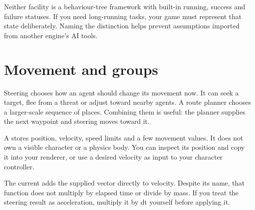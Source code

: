 \documentclass[11pt,a4paper]{article}
\begin{document}
Neither facility is a behaviour-tree framework with built-in running, success and failure statuses. If you need long-running tasks, your game must represent that state deliberately. Naming the distinction helps prevent assumptions imported from another engine's AI tools.
\clearpage\part{Movement and groups}
Steering chooses how an agent should change its movement now. It can seek a target, flee from a threat or adjust toward nearby agents. A route planner chooses a larger-scale sequence of places. Combining them is useful: the planner supplies the next waypoint and steering moves toward it.

A  stores position, velocity, speed limits and a few movement values. It does not own a visible character or a physics body. You can inspect its position and copy it into your renderer, or use a desired velocity as input to your character controller.

The current  adds the supplied vector directly to velocity. Despite its name, that function does not multiply by elapsed time or divide by mass. If you treat the steering result as acceleration, multiply it by dt yourself before applying it.
\end{document}
